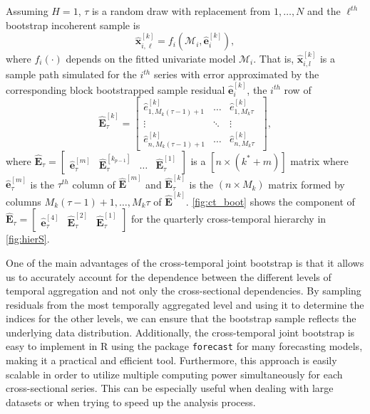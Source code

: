 \documentclass[a4paper,11pt]{article}
\newcommand{\evet}{\bm{e}}
\newcommand{\xvet}{\bm{x}}
\newcommand{\Evet}{\bm{E}}
\theoremstyle{definition}
\begin{document}
Assuming $H = 1$, $\tau$ is a random draw with replacement from $1,\dots, N$ and the $\ell^{th}$ bootstrap incoherent sample is
$$
	\widehat{\xvet}_{i,\ell}^{[k]} = f_i(\mathcal{M}_i, \widehat{\evet}_{i}^{[k]}),
$$
where $f_i(\cdot)$ depends on the fitted univariate model $\mathcal{M}_i$. That is, $\widehat{\xvet}_{i,l}^{[k]}$ is a sample path simulated for the $i^{th}$ series with error approximated by the corresponding block bootstrapped sample residual $\widehat{\evet}_{i}^{[k]}$, the $i^{th}$ row of
$$
	\widehat{\Evet}^{[k]}_{\tau} = \begin{bmatrix}
		\widehat{e}^{[k]}_{1,M_k(\tau-1)+1} & \dots  & \widehat{e}^{[k]}_{1,M_k\tau}   \\
		\vdots                              & \ddots & \vdots                          \\
		\widehat{e}^{[k]}_{n,M_k(\tau-1)+1} & \dots  & \widehat{e}^{[k]}_{n,M_k\tau} \
	\end{bmatrix},
$$
where $\widehat{\Evet}_{\tau} = \begin{bmatrix}
		\widehat{\evet}^{[m]}_\tau & \widehat{\Evet}^{[k_{p-1}]}_{\tau} & \dots & \widehat{\Evet}^{[1]}_{\tau}
	\end{bmatrix}$ is a $[n \times (k^\ast + m)]$ matrix where $\widehat{\evet}^{[m]}_\tau$ is the $\tau^{th}$ column of $\widehat{\Evet}^{[m]}$ and $\widehat{\Evet}^{[k]}_{\tau}$ is the $(n \times M_k)$ matrix formed by columns $M_k(\tau-1)+1,\dots, M_k \tau$ of $\widehat{\Evet}^{[k]}$. 	\autoref{fig:ct_boot} shows the component of $\widehat{\Evet}_{\tau} = \begin{bmatrix}
		\widehat{\evet}^{[4]}_\tau & \widehat{\Evet}^{[2]}_{\tau} & \widehat{\Evet}^{[1]}_{\tau}
	\end{bmatrix}$ for the quarterly cross-temporal hierarchy in \autoref{fig:hierS}.

One of the main advantages of the cross-temporal joint bootstrap is that it allows us to accurately account for the dependence between the different levels of temporal aggregation and not only the cross-sectional dependencies. By sampling residuals from the most temporally aggregated level and using it to determine the indices for the other levels, we can ensure that the bootstrap sample reflects the underlying data distribution. Additionally, the cross-temporal joint bootstrap is easy to implement in \textsf{R} \citep{rcoreteam2022} using the package \texttt{forecast} \citep{Rforecast} for many forecasting models, making it a practical and efficient tool. Furthermore, this approach is easily scalable in order to utilize multiple computing power simultaneously for each cross-sectional series. This can be especially useful when dealing with large datasets or when trying to speed up the analysis process.
\end{document}
